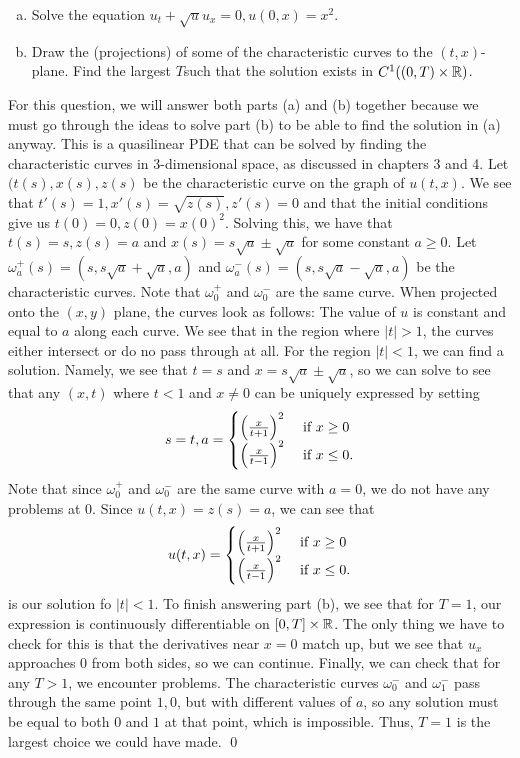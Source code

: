 \documentclass{article}
\begin{document}
\newpage
{}
\begin{enumerate}[(a)]
    \item Solve the equation $u_t+ \sqrt{u}u_x= 0, u(0, x) = x^2$.
    \item  Draw the (projections) of some of the characteristic curves to the $(t, x)$-plane. Find the
    largest $T $such that the solution exists in $C^1((0, T ) \times 
    \mathbb{R})$.
\end{enumerate}
\tri 
\hop 
For this question, we will answer both parts (a) and (b) together because we must go through the ideas to solve part (b) to be able to find the solution in (a) anyway. This is a quasilinear PDE that can be solved by finding the characteristic curves in 3-dimensional space, as discussed in chapters 3 and 4. 
\hop 
Let $(t(s), x(s), z(s)$ be the characteristic curve on the graph of $u(t,x)$. We see that $t'(s) = 1, x'(s)=\sqrt{z(s)}, z'(s) = 0$ and that the initial conditions give us $t(0)=0, z(0)= x(0)^2.$ Solving this, we have that $t(s)=s, z(s)=a$ and $x(s) = s\sqrt{a} \pm \sqrt{a}$ for some constant $a\ge0$. Let $\omega^+_a(s) = (s, s\sqrt{a} + \sqrt{a}, a)$ and $\omega^-_a(s) = (s, s\sqrt{a} - \sqrt{a}, a)$ be the characteristic curves. Note that $\omega^+_0$ and $\omega^-_0$ are the same curve. When projected onto the $(x,y)$ plane, the curves look as follows:
\hop %
The value of $u$ is constant and equal to $a$ along each curve. We see that in the region where $|t| > 1$, the curves either intersect or do no pass through at all. For the region $|t| < 1$, we can find a solution. Namely, we see that $t= s$ and $x = s\sqrt{a} \pm \sqrt{a}$, so we can solve to see that any $(x,t)$ where $t < 1$ and $x \ne 0$ can be uniquely expressed by setting 
\[s= t, a = \begin{cases}
    \del{\frac{x}{t+1}}^2 &\text{ if } x\ge  0 \\
    \del{\frac{x}{t-1}}^2 &\text{ if } x\le 0.
\end{cases}\]
Note that since $\omega^+_0$ and $\omega^-_0$ are the same curve with $a=0$, we do not have any problems at 0. Since $u(t,x) = z(s) = a$, we can see that  
\[u(t,x) = \begin{cases}
    \del{\frac{x}{t+1}}^2 &\text{ if } x\ge  0 \\
    \del{\frac{x}{t-1}}^2 &\text{ if } x\le 0.
\end{cases}\]
is our solution fo $|t|<1$. To finish answering part (b), we see that for $T=1$, our expression is continuously differentiable on $[0,T] \times \mathbb{R}$. The only thing we have to check for this is that the derivatives near $x = 0$ match up, but we see that $u_x$ approaches $0$ from both sides, so we can continue.
\hop 
Finally, we can check that for any $T>1$, we encounter problems. The characteristic curves $\omega_0^-$ and $\omega_1^-$ pass through the same point $1, 0$, but with different values of $a$, so any solution must be equal to both $0$ and $1$ at that point, which is impossible. Thus, $T=1$ is the largest choice we could have made. \qed
\hop
\end{document}
